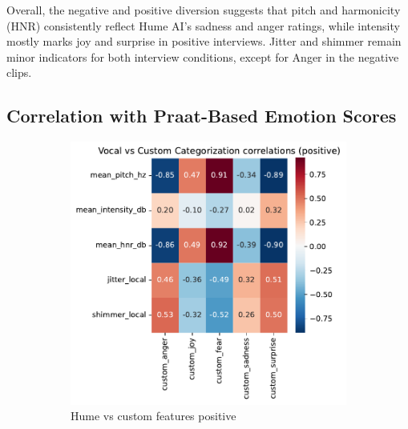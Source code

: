 \medskip
Overall, the negative and positive diversion suggests that pitch and harmonicity (HNR) consistently reflect Hume AI’s sadness and anger ratings, while intensity mostly marks joy and surprise in positive interviews. Jitter and shimmer remain minor indicators for both interview conditions, except for Anger in the negative clips. 

\subsection{Correlation with Praat-Based Emotion Scores}

\begin{figure}[H]
    \centering 
    \begin{subfigure}[b]{0.45\textwidth}
        \includegraphics[width=\textwidth]{png/results/rq1_new/vocal_vs_custom_categorization_correlations_positive.pdf}
        \caption{Hume vs custom features positive}
        \label{fig:custom_vocal_positive}
    \end{subfigure}
    \begin{subfigure}[b]{0.45\textwidth}

\end{subfigure}
\end{figure}
